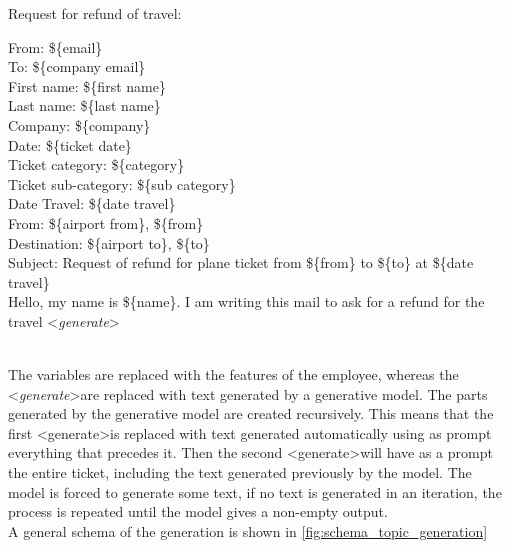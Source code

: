 Request for refund of travel:
\begin{adjustwidth}{1cm}{}
From: \$\{email\} \\
To: \$\{company email\} \\
First name: \$\{first name\}\\
Last name: \$\{last name\}\\
Company: \$\{company\}\\
Date: \$\{ticket date\}\\
Ticket category: \$\{category\}\\
Ticket sub-category: \$\{sub category\} \\
Date Travel: \$\{date travel\} \\
From: \$\{airport from\}, \$\{from\} \\
Destination: \$\{airport to\}, \$\{to\} \\
Subject: Request of refund for plane ticket from \$\{from\} to \$\{to\} at \$\{date travel\}
\\
Hello, my name is \$\{name\}. I am writing this mail to ask for a refund for the travel \textless \textit{generate}\textgreater \\ \\

\end{adjustwidth}
        
The variables are replaced with the features of the employee, whereas the \textless \textit{generate}\textgreater \space are replaced with text generated by a generative model. The parts generated by the generative model are created recursively. This means that the first \textless generate\textgreater \space is replaced with text generated automatically using as prompt everything that precedes it. Then the second \textless generate\textgreater \space will have as a prompt the entire ticket, including the text generated previously by the model. The model is forced to generate some text, if no text is generated in an iteration, the process is repeated until the model gives a non-empty output. \\
A general schema of the generation is shown in \autoref{fig:schema_topic_generation}

